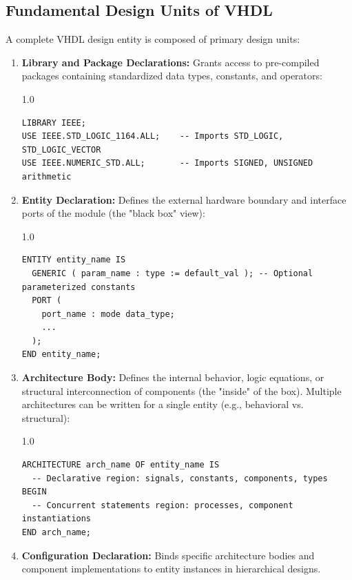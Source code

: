 \documentclass[12pt,a4paper]{article}
\begin{document}
\subsection{Fundamental Design Units of VHDL}
A complete VHDL design entity is composed of primary design units:
\begin{enumerate}[label=\arabic*., leftmargin=*]
  \item \textbf{Library and Package Declarations:} Grants access to pre-compiled packages containing standardized data types, constants, and operators:
\begin{spacing}{1.0}
\begin{verbatim}
LIBRARY IEEE;
USE IEEE.STD_LOGIC_1164.ALL;    -- Imports STD_LOGIC, STD_LOGIC_VECTOR
USE IEEE.NUMERIC_STD.ALL;       -- Imports SIGNED, UNSIGNED arithmetic
\end{verbatim}
\end{spacing}
  \item \textbf{Entity Declaration:} Defines the external hardware boundary and interface ports of the module (the "black box" view):
\begin{spacing}{1.0}
\begin{verbatim}
ENTITY entity_name IS
  GENERIC ( param_name : type := default_val ); -- Optional parameterized constants
  PORT (
    port_name : mode data_type;
    ...
  );
END entity_name;
\end{verbatim}
\end{spacing}
  \item \textbf{Architecture Body:} Defines the internal behavior, logic equations, or structural interconnection of components (the "inside" of the box). Multiple architectures can be written for a single entity (e.g., behavioral vs. structural):
\begin{spacing}{1.0}
\begin{verbatim}
ARCHITECTURE arch_name OF entity_name IS
  -- Declarative region: signals, constants, components, types
BEGIN
  -- Concurrent statements region: processes, component instantiations
END arch_name;
\end{verbatim}
\end{spacing}
  \item \textbf{Configuration Declaration:} Binds specific architecture bodies and component implementations to entity instances in hierarchical designs.
\end{enumerate}
\end{document}
